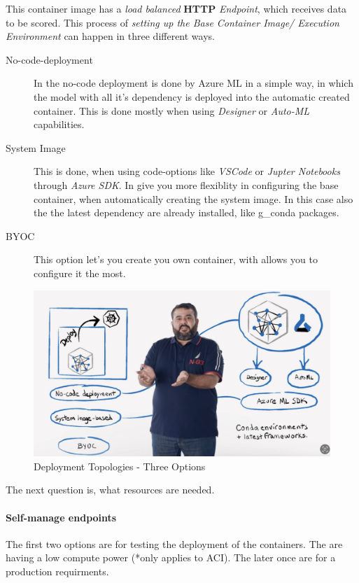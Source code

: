 This container image has a \textit{load balanced} \textbf{\gls{HTTP}} \textit{Endpoint}, which receives data to be scored. This process of \textit{setting up the Base Container Image/ Execution Environment} can happen in three different ways.
\begin{description}
	\item[No-code-deployment] In the no-code deployment is done by Azure ML in a simple way, in which the model with all it's dependency is deployed into the automatic created container. This is done mostly when using \textit{Designer} or \textit{Auto-ML} capabilities.
	\item[System Image] This is done, when using code-options like \textit{VSCode} or \textit{Jupter Notebooks} through \textit{Azure SDK}.  In give you more flexiblity in configuring the base container, when automatically creating the system image. In this case also the the latest dependency are already installed, like \gls{g_conda} packages.
	\item[\gls{BYOC}] This option let's you create you own container, with allows you to configure it the most.
\end{description}

\begin{figure}[H]
	\centering
	\includegraphics[scale = 0.2]{attachment/chapter_10/Scc015}
	\caption{Deployment Topologies - Three Options}
\end{figure}


The next question is, what resources are needed. 
\paragraph{Self-manage endpoints}

The first two options are for testing the deployment of the containers. The are having a low compute power (*only applies to \gls{ACI}). The later once are for a production requirments.

